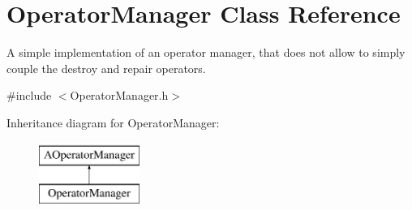 \hypertarget{classOperatorManager}{\section{\-Operator\-Manager \-Class \-Reference}
\label{classOperatorManager}
}


\-A simple implementation of an operator manager, that does not allow to simply couple the destroy and repair operators.  




{\ttfamily \#include $<$\-Operator\-Manager.\-h$>$}

\-Inheritance diagram for \-Operator\-Manager\-:\begin{figure}[H]
\begin{center}
\leavevmode
\includegraphics[height=2.000000cm]{classOperatorManager}
\end{center}
\end{figure}
